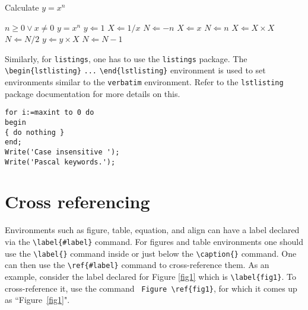\documentclass[unnumsec,webpdf,contemporary,large]{oup-authoring-template}%
\theoremstyle{thmstyleone}%
\theoremstyle{thmstyletwo}%
\theoremstyle{thmstylethree}%
\begin{document}
\begin{algorithm}[!t]
\caption{Calculate $y = x^n$}\label{algo1}
\begin{algorithmic}[1]
\Require $n \geq 0 \vee x \neq 0$
\Ensure $y = x^n$
\State $y \Leftarrow 1$
        \State $X \Leftarrow 1 / x$
        \State $N \Leftarrow -n$
\Else
        \State $X \Leftarrow x$
        \State $N \Leftarrow n$
\EndIf
{}
            \State $X \Leftarrow X \times X$
            \State $N \Leftarrow N / 2$
        \Else[$N$ is odd]
            \State $y \Leftarrow y \times X$
            \State $N \Leftarrow N - 1$
        \EndIf
\EndWhile
\end{algorithmic}
\end{algorithm}

Similarly, for \verb+listings+, one has to use the \verb+listings+ package. The \verb+\begin{lstlisting}+ \verb+...+ \verb+\end{lstlisting}+ environment is used to set environments similar to the \verb+verbatim+ environment. Refer to the \verb+lstlisting+ package documentation for more details on this.


\begin{minipage}{\hsize}%
\lstset{language=Pascal}%
\begin{lstlisting}[frame=single,framexleftmargin=-1pt,framexrightmargin=-17pt,framesep=12pt,linewidth=0.98\textwidth]
for i:=maxint to 0 do
begin
{ do nothing }
end;
Write('Case insensitive ');
Write('Pascal keywords.');
\end{lstlisting}
\end{minipage}



\section{Cross referencing}\label{sec8}

Environments such as figure, table, equation, and align can have a label
declared via the \verb+\label{#label}+ command. For figures and table
environments one should use the \verb+\label{}+ command inside or just
below the \verb+\caption{}+ command.  One can then use the
\verb+\ref{#label}+ command to cross-reference them. As an example, consider
the label declared for Figure \ref{fig1} which is
\verb+\label{fig1}+. To cross-reference it, use the command
\verb+ Figure \ref{fig1}+, for which it comes up as
``Figure~\ref{fig1}".
\end{document}
